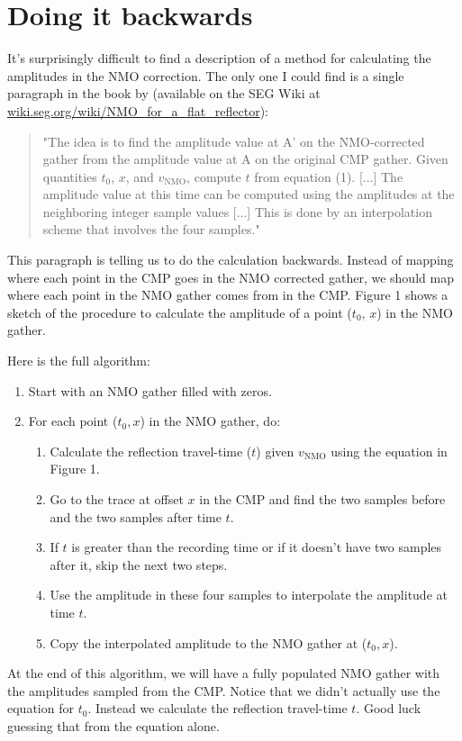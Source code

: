 \section{Doing it backwards}

It's surprisingly difficult to find a description of a method for calculating
the amplitudes in the NMO correction.
The only one I could find is a single paragraph in the book by
\citet{Yilmaz_2001} (available on the SEG Wiki at
\href{http://wiki.seg.org/wiki/NMO_for_a_flat_reflector}{wiki.seg.org/wiki/NMO\_for\_a\_flat\_reflector}):

\begin{quotation}
"The idea is to find the amplitude value at A' on the NMO-corrected gather from the amplitude value at A on the original CMP gather. Given quantities $t_0$, $x$, and $v_\mathrm{NMO}$, compute $t$ from equation (1). [...] The amplitude value at this time can be computed using the amplitudes at the neighboring integer sample values [...] This is done by an interpolation scheme that involves the four samples."
\end{quotation}

This paragraph is telling us to do the calculation backwards.
Instead of mapping where each point in the CMP goes in the NMO corrected
gather, we should map where each point in the NMO gather comes from in the CMP.
Figure 1 shows a sketch of the procedure to calculate the amplitude of a point
($t_0$, $x$) in the NMO gather.

Here is the full algorithm:

\begin{enumerate}
    \item Start with an NMO gather filled with zeros.
    \item For each point ($t_0, x$) in the NMO gather, do:
    \begin{enumerate}
        \item Calculate the reflection travel-time ($t$) given $v_\mathrm{NMO}$ using
              the equation in Figure 1.
        \item Go to the trace at offset $x$ in the CMP and find the two samples
              before and the two samples after time $t$.
        \item If $t$ is greater than the recording time or if it doesn't have
              two samples after it, skip the next two steps.
        \item Use the amplitude in these four samples to interpolate the
              amplitude at time $t$.
        \item Copy the interpolated amplitude to the NMO gather at ($t_0, x$).
    \end{enumerate}
\end{enumerate}

At the end of this algorithm, we will have a fully populated NMO gather with
the amplitudes sampled from the CMP.
Notice that we didn't actually use the equation for $t_0$.
Instead we calculate the reflection travel-time $t$.
Good luck guessing that from the equation alone.
